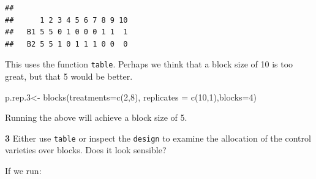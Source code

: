 \documentclass[
]{book}
\makeatletter
\newenvironment{Shaded}{\begin{snugshade}}{\end{snugshade}}
\newcommand{\AttributeTok}[1]{\textcolor[rgb]{0.77,0.63,0.00}{#1}}
\newcommand{\DecValTok}[1]{\textcolor[rgb]{0.00,0.00,0.81}{#1}}
\newcommand{\FloatTok}[1]{\textcolor[rgb]{0.00,0.00,0.81}{#1}}
\newcommand{\FunctionTok}[1]{\textcolor[rgb]{0.00,0.00,0.00}{#1}}
\newcommand{\NormalTok}[1]{#1}
\newcommand{\OtherTok}[1]{\textcolor[rgb]{0.56,0.35,0.01}{#1}}
\newcommand{\SpecialCharTok}[1]{\textcolor[rgb]{0.00,0.00,0.00}{#1}}
\newenvironment{kframe}{%
\medskip{}
\setlength{\fboxsep}{.8em}
 \def\at@end@of@kframe{}%
 \ifinner\ifhmode%
  \def\at@end@of@kframe{\end{minipage}}%
  \begin{minipage}{\columnwidth}%
 \fi\fi%
 \def\FrameCommand##1{\hskip\@totalleftmargin \hskip-\fboxsep
 \colorbox{shadecolor}{##1}\hskip-\fboxsep
     \hskip-\linewidth \hskip-\@totalleftmargin \hskip\columnwidth}%
 \MakeFramed {\advance\hsize-\width
   \@totalleftmargin\z@ \linewidth\hsize
   \@setminipage}}%
 {\par\unskip\endMakeFramed%
 \at@end@of@kframe}
\newenvironment{rmdblock}[1]
  {
  \begin{itemize}
  \renewcommand{\labelitemi}{
    \raisebox{-.7\height}[0pt][0pt]{
      {\setkeys{Gin}{width=3em,keepaspectratio}\texttt{[image: images/\#1]}}
    }
  }
  \setlength{\fboxsep}{1em}
  \begin{kframe}
  \item
  }
  {
  \end{kframe}
  \end{itemize}
  }
\newenvironment{rmdquiz}
  {\begin{rmdblock}{quiz}}
  {\end{rmdblock}}
\makeatother
\begin{document}
\begin{Shaded}
\end{Shaded}

\begin{verbatim}
##     
##      1 2 3 4 5 6 7 8 9 10
##   B1 5 5 0 1 0 0 0 1 1  1
##   B2 5 5 1 0 1 1 1 0 0  0
\end{verbatim}

This uses the function \texttt{table}. Perhaps we think that a block size of 10 is too great, but that 5 would be better.

\begin{Shaded}
\begin{Highlighting}[]
\NormalTok{p.rep}\FloatTok{.3}\OtherTok{\textless{}{-}} \FunctionTok{blocks}\NormalTok{(}\AttributeTok{treatments=}\FunctionTok{c}\NormalTok{(}\DecValTok{2}\NormalTok{,}\DecValTok{8}\NormalTok{), }\AttributeTok{replicates =} \FunctionTok{c}\NormalTok{(}\DecValTok{10}\NormalTok{,}\DecValTok{1}\NormalTok{),}\AttributeTok{blocks=}\DecValTok{4}\NormalTok{)}
\end{Highlighting}
\end{Shaded}

Running the above will achieve a block size of 5.

\begin{rmdquiz}
\textbf{3} Either use \texttt{table} or inspect the \texttt{design} to examine the allocation of the control varieties over blocks. Does it look sensible?
\end{rmdquiz}

If we run:

\begin{Shaded}
\end{Shaded}
\end{document}

